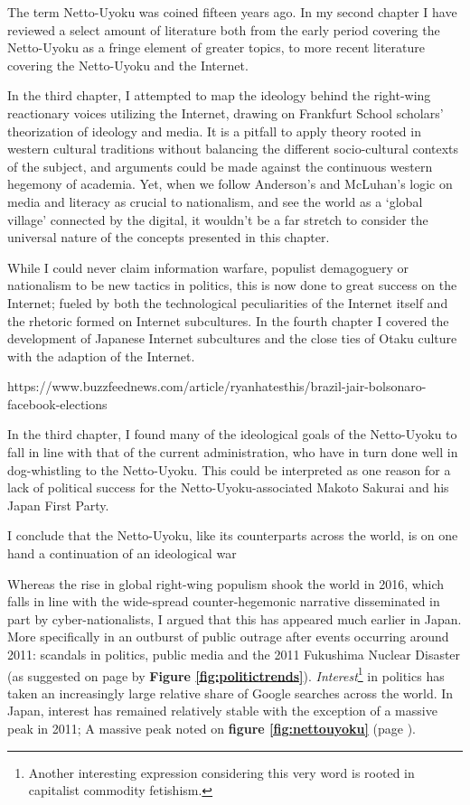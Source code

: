 \documentclass[10pt,british,A4paper,,openany]{memoir}
\begin{document}
The term Netto-Uyoku was coined fifteen years ago. In my second chapter
I have reviewed a select amount of literature both from the early period
covering the Netto-Uyoku as a fringe element of greater topics, to more
recent literature covering the Netto-Uyoku and the Internet.

In the third chapter, I attempted to map the ideology behind the
right-wing reactionary voices utilizing the Internet, drawing on
Frankfurt School scholars' theorization of ideology and media. It is a
pitfall to apply theory rooted in western cultural traditions without
balancing the different socio-cultural contexts of the subject, and
arguments could be made against the continuous western hegemony of
academia. Yet, when we follow Anderson's and McLuhan's logic on media
and literacy as crucial to nationalism, and see the world as a `global
village' connected by the digital, it wouldn't be a far stretch to
consider the universal nature of the concepts presented in this chapter.

While I could never claim information warfare, populist demagoguery or
nationalism to be new tactics in politics, this is now done to great
success on the Internet; fueled by both the technological peculiarities
of the Internet itself and the rhetoric formed on Internet subcultures.
In the fourth chapter I covered the development of Japanese Internet
subcultures and the close ties of Otaku culture with the adaption of the
Internet.

https://www.buzzfeednews.com/article/ryanhatesthis/brazil-jair-bolsonaro-facebook-elections

In the third chapter, I found many of the ideological goals of the
Netto-Uyoku to fall in line with that of the current administration, who
have in turn done well in dog-whistling to the Netto-Uyoku. This could
be interpreted as one reason for a lack of political success for the
Netto-Uyoku-associated Makoto Sakurai and his Japan First Party.

I conclude that the Netto-Uyoku, like its counterparts across the world,
is on one hand a continuation of an ideological war

Whereas the rise in global right-wing populism shook the world in 2016,
which falls in line with the wide-spread counter-hegemonic narrative
disseminated in part by cyber-nationalists, I argued that this has
appeared much earlier in Japan. More specifically in an outburst of
public outrage after events occurring around 2011: scandals in politics,
public media and the 2011 Fukushima Nuclear Disaster (as suggested on
page \pageref{populism-gt} by \textbf{Figure \ref{fig:politictrends}}).
\emph{Interest}\footnote{Another interesting expression considering this
  very word is rooted in capitalist commodity fetishism.} in politics
has taken an increasingly large relative share of Google searches across
the world. In Japan, interest has remained relatively stable with the
exception of a massive peak in 2011; A massive peak noted on
\textbf{figure \ref{fig:nettouyoku}} (page \pageref{nettouyoku-gt}).
\end{document}
